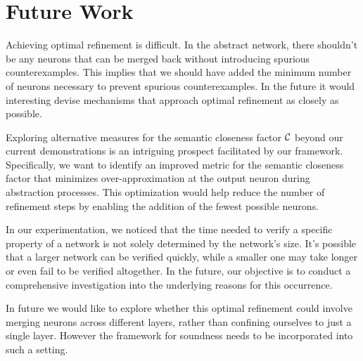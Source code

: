 \section{Future Work}
Achieving optimal refinement is difficult. In the abstract network, 
there shouldn't be any neurons that can be merged back without introducing 
spurious counterexamples. This implies that we should have added the minimum number of 
neurons necessary to prevent spurious counterexamples. In the future it would 
interesting devise mechanisms that approach optimal refinement as
closely as possible.

Exploring alternative measures for the semantic closeness factor $\mathcal{C}$ 
beyond our current demonstrations is an intriguing prospect facilitated by 
our framework. Specifically, we want to identify an improved metric for the 
semantic closeness factor that minimizes over-approximation at the output 
neuron during abstraction processes. This optimization would help reduce the number 
of refinement steps by enabling the addition of the fewest possible neurons.

In our experimentation, we noticed that the time needed to verify a specific 
property of a network is not solely determined by the network's size. It's possible 
that a larger network can be verified quickly, while a smaller one may take longer 
or even fail to be verified altogether. In the future, our objective is to conduct a 
comprehensive investigation into the underlying reasons for this occurrence.

In future we would like to explore whether this optimal refinement 
could involve merging neurons across different layers, rather than confining 
ourselves to just a single layer. However the framework for soundness needs to be
incorporated into such a setting.








